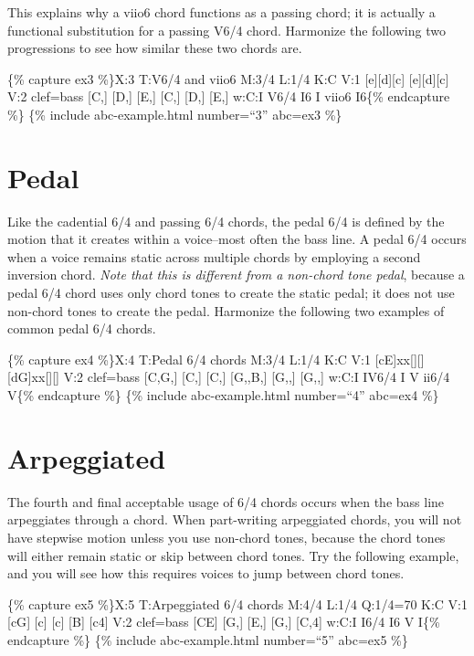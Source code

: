 \documentclass{book}
\begin{document}
This explains why a viio6 chord functions as a passing chord; it is actually a
functional substitution for a passing V6/4 chord. Harmonize the following two
progressions to see how similar these two chords are.

\{\% capture ex3 \%\}X:3 T:V6/4 and viio6 M:3/4 L:1/4 K:C V:1
{[}e{]}{[}d{]}{[}c{]}\textbar\textbar{} {[}e{]}{[}d{]}{[}c{]}\textbar{]} V:2
clef=bass {[}C,{]} {[}D,{]} {[}E,{]}\textbar\textbar{} {[}C,{]} {[}D,{]}
{[}E,{]}\textbar{]} w:C:I V6/4 I6 I viio6 I6\{\% endcapture \%\} \{\% include
abc-example.html number=``3'' abc=ex3 \%\}

\hypertarget{pedal}{%
\section{Pedal}\label{pedal}}

Like the cadential 6/4 and passing 6/4 chords, the pedal 6/4 is defined by the
motion that it creates within a voice--most often the bass line. A pedal 6/4
occurs when a voice remains static across multiple chords by employing a
second inversion chord. \emph{Note that this is different from a non-chord
tone pedal}, because a pedal 6/4 chord uses only chord tones to create the
static pedal; it does not use non-chord tones to create the pedal. Harmonize
the following two examples of common pedal 6/4 chords.

\{\% capture ex4 \%\}X:4 T:Pedal 6/4 chords M:3/4 L:1/4 K:C V:1
{[}cE{]}xx{[}{]}{[}{]}\textbar\textbar{} {[}dG{]}xx{[}{]}{[}{]}\textbar{]} V:2
clef=bass {[}C,G,{]} {[}C,{]} {[}C,{]}\textbar\textbar{} {[}G,,B,{]} {[}G,,{]}
{[}G,,{]}\textbar{]} w:C:I IV6/4 I V ii6/4 V\{\% endcapture \%\} \{\% include
abc-example.html number=``4'' abc=ex4 \%\}

\hypertarget{arpeggiated}{%
\section{Arpeggiated}\label{arpeggiated}}

The fourth and final acceptable usage of 6/4 chords occurs when the bass line
arpeggiates through a chord. When part-writing arpeggiated chords, you will
not have stepwise motion unless you use non-chord tones, because the chord
tones will either remain static or skip between chord tones. Try the following
example, and you will see how this requires voices to jump between chord
tones.

\{\% capture ex5 \%\}X:5 T:Arpeggiated 6/4 chords M:4/4 L:1/4 Q:1/4=70 K:C V:1
{[}cG{]} {[}c{]} {[}c{]} {[}B{]}\textbar{} {[}c4{]}\textbar{]} V:2 clef=bass
{[}CE{]} {[}G,{]} {[}E,{]} {[}G,{]}\textbar{} {[}C,4{]}\textbar{]} w:C:I I6/4
I6 V I\{\% endcapture \%\} \{\% include abc-example.html number=``5'' abc=ex5
\%\}
\end{document}
